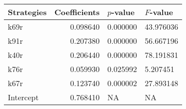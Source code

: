 \begin{tabular}{lrll}
\toprule
Strategies & Coefficients & $p$-value & $F$-value \\
\midrule
k69r & 0.098640 & 0.000000 & 43.976036 \\
k91r & 0.207380 & 0.000000 & 56.667196 \\
k40r & 0.206440 & 0.000000 & 78.191831 \\
k76r & 0.059930 & 0.025992 & 5.207451 \\
k67r & 0.123740 & 0.000002 & 27.893148 \\
Intercept & 0.768410 & NA & NA \\
\bottomrule
\end{tabular}

